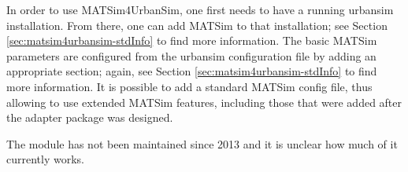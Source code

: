 In order to use MATSim4UrbanSim, one first needs to have a running \acrshort{urbansim} installation.  From there, one can add MATSim to that installation; see Section \ref{sec:matsim4urbansim-stdInfo} to find more information.  The basic MATSim parameters are configured from the \acrshort{urbansim} configuration file by adding an appropriate section; again, see Section \ref{sec:matsim4urbansim-stdInfo} to find more information.  It is possible to add a standard MATSim config file, thus allowing to use extended MATSim features, including those that were added after the adapter package was designed.

The module has not been maintained since 2013 and it is unclear how much of it currently works.





